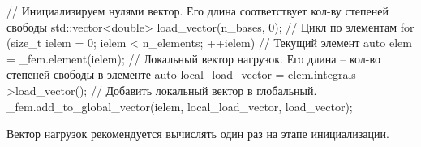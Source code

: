 \begin{cppcode}
// Инициализируем нулями вектор. Его длина соответствует кол-ву степеней свободы
std::vector<double> load_vector(n_bases, 0);
// Цикл по элементам
for (size_t ielem = 0; ielem < n_elements; ++ielem){
	// Текущий элемент
	auto elem = _fem.element(ielem);
	// Локальный вектор нагрузок. Его длина -- кол-во степеней свободы в элементе
	auto local_load_vector = elem.integrals->load_vector();
	// Добавить локальный вектор в глобальный.
	_fem.add_to_global_vector(ielem, local_load_vector, load_vector);
}
\end{cppcode}
Вектор нагрузок рекомендуется вычислять один раз на этапе инициализации.
